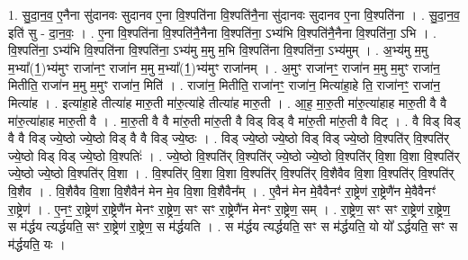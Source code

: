 \documentclass[17pt]{extarticle}
\begin{document}
1. सु॒दा॒न॒व॒ ए॒नैना सु॑दानवः सुदानव ए॒ना वि॒श्पति॑ना वि॒श्पति॑नै॒ना सु॑दानवः सुदानव ए॒ना वि॒श्पति॑ना । . सु॒दा॒न॒व॒ इति॑ सु - दा॒न॒वः॒ । . ए॒ना वि॒श्पति॑ना वि॒श्पति॑नै॒नैना वि॒श्पति॑ना॒ ऽभ्य॑भि वि॒श्पति॑नै॒नैना वि॒श्पति॑ना॒ ऽभि । . वि॒श्पति॑ना॒ ऽभ्य॑भि वि॒श्पति॑ना वि॒श्पति॑ना॒ ऽभ्य॑मु म॒मु म॒भि वि॒श्पति॑ना वि॒श्पति॑ना॒ ऽभ्य॑मुम् । . अ॒भ्य॑मु म॒मु म॒भ्या᳚(1॒)भ्य॑मुꣳ राजा॑नꣳ॒॒ राजा॑न म॒मु म॒भ्या᳚(1॒)भ्य॑मुꣳ राजा॑नम् । . अ॒मुꣳ राजा॑नꣳ॒॒ राजा॑न म॒मु म॒मुꣳ राजा॑न॒ मितीति॒ राजा॑न म॒मु म॒मुꣳ राजा॑न॒ मिति॑ । . राजा॑न॒ मितीति॒ राजा॑नꣳ॒॒ राजा॑न॒ मित्या॑हा॒हे ति॒ राजा॑नꣳ॒॒ राजा॑न॒ मित्या॑ह । . इत्या॑हा॒हे तीत्या॑ह मारु॒ती मा॑रु॒त्या॑हे तीत्या॑ह मारु॒ती । . आ॒ह॒ मा॒रु॒ती मा॑रु॒त्या॑हाह मारु॒ती वै वै मा॑रु॒त्या॑हाह मारु॒ती वै । . मा॒रु॒ती वै वै मा॑रु॒ती मा॑रु॒ती वै विड् विड् वै मा॑रु॒ती मा॑रु॒ती वै विट् । . वै विड् विड् वै वै विड् ज्ये॒ष्ठो ज्ये॒ष्ठो विड् वै वै विड् ज्ये॒ष्ठः । . विड् ज्ये॒ष्ठो ज्ये॒ष्ठो विड् विड् ज्ये॒ष्ठो वि॒श्पति॑र् वि॒श्पति॑र् ज्ये॒ष्ठो विड् विड् ज्ये॒ष्ठो वि॒श्पतिः॑ । . ज्ये॒ष्ठो वि॒श्पति॑र् वि॒श्पति॑र् ज्ये॒ष्ठो ज्ये॒ष्ठो वि॒श्पति॑र् वि॒शा वि॒शा वि॒श्पति॑र् ज्ये॒ष्ठो ज्ये॒ष्ठो वि॒श्पति॑र् वि॒शा । . वि॒श्पति॑र् वि॒शा वि॒शा वि॒श्पति॑र् वि॒श्पति॑र् वि॒शैवैव वि॒शा वि॒श्पति॑र् वि॒श्पति॑र् वि॒शैव । . वि॒शैवैव वि॒शा वि॒शैवैन॑ मेन मे॒व वि॒शा वि॒शैवैन᳚म् । . ए॒वैन॑ मेन मे॒वैवैनꣳ॑ रा॒ष्ट्रेण॑ रा॒ष्ट्रेणै॑न मे॒वैवैनꣳ॑ रा॒ष्ट्रेण॑ । . ए॒नꣳ॒॒ रा॒ष्ट्रेण॑ रा॒ष्ट्रेणै॑न मेनꣳ रा॒ष्ट्रेण॒ सꣳ सꣳ रा॒ष्ट्रेणै॑न मेनꣳ रा॒ष्ट्रेण॒ सम् । . रा॒ष्ट्रेण॒ सꣳ सꣳ रा॒ष्ट्रेण॑ रा॒ष्ट्रेण॒ स म॑र्द्धय त्यर्द्धयति॒ सꣳ रा॒ष्ट्रेण॑ रा॒ष्ट्रेण॒ स म॑र्द्धयति । . स म॑र्द्धय त्यर्द्धयति॒ सꣳ स म॑र्द्धयति॒ यो यो᳚ ऽर्द्धयति॒ सꣳ स म॑र्द्धयति॒ यः । \newline
\end{document}
